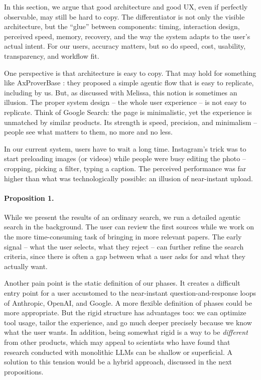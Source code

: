 \begin{summarybox}
In this section, we argue that good architecture and good UX, even if perfectly observable, may still be hard to copy. The differentiator is not only the visible architecture, but the ``glue'' between components: timing, interaction design, perceived speed, memory, recovery, and the way the system adapts to the user's actual intent. For our users, accuracy matters, but so do speed, cost, usability, transparency, and workflow fit.
\end{summarybox}

One perspective is that architecture is easy to copy. That may hold for something like AxProverBase \cite{2602.24273}: they proposed a simple agentic flow that is easy to replicate, including by us. But, as discussed with Melissa, this notion is sometimes an illusion. The proper system design -- the whole user experience -- is not easy to replicate. Think of Google Search: the page is minimalistic, yet the experience is unmatched by similar products. Its strength is speed, precision, and minimalism -- people see what matters to them, no more and no less.

In our current system, users have to wait a long time. Instagram's trick was to start preloading images (or videos) while people were busy editing the photo --  cropping, picking a filter, typing a caption. The perceived performance was far higher than what was technologically possible: an illusion of near-instant upload.

\paragraph{Proposition 1.} While we present the results of an ordinary search, we run a detailed agentic search in the background. The user can review the first sources while we work on the more time-consuming task of bringing in more relevant papers. The early signal -- what the user selects, what they reject -- can further refine the search criteria, since there is often a gap between what a user asks for and what they actually want.

Another pain point is the static definition of our phases. It creates a difficult entry point for a user accustomed to the near-instant question-and-response loops of Anthropic, OpenAI, and Google. A more flexible definition of phases could be more appropriate. But the rigid structure has advantages too: we can optimize tool usage, tailor the experience, and go much deeper precisely because we know what the user wants. In addition, being somewhat rigid is a way to be \emph{different} from other products, which may appeal to scientists who have found that research conducted with monolithic LLMs can be shallow or superficial. A solution to this tension would be a hybrid approach, discussed in the next propositions.


